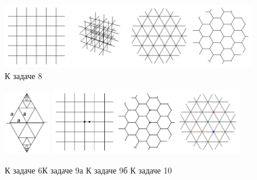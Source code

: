 \documentclass[14pt]{article}
\begin{document}
\begin{figure}[f]
\begin{center}
\includegraphics[width=0.99\textwidth]{infcirc6.png}
\caption{К задаче 8}
\end{center}
\end{figure}
\begin{figure}[f]
\begin{center}
\includegraphics[width=0.18\textwidth]{infcirc8.png}
\includegraphics[width=0.75\textwidth]{infcirc7.png}
\caption{\hspace{-0.6cm}К задаче 6\hspace{2cm}К задаче 9а\hspace{2.3cm} К задаче 9б\hspace{2.3cm} К задаче 10}
\end{center}
\end{figure}
\end{document}
